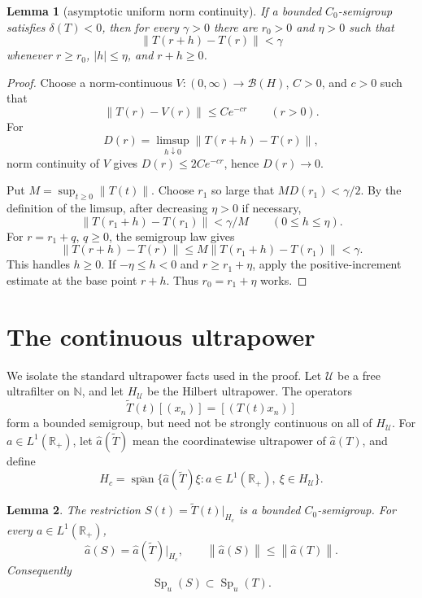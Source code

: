 \documentclass[11pt]{article}
\newtheorem{lemma}{Lemma}
\newcommand{\R}{\mathbb R}
\newcommand{\B}{\mathcal B}
\newcommand{\norm}[1]{\left\lVert#1\right\rVert}
\newcommand{\Spu}{\operatorname{Sp}_{u}}
\begin{document}
\begin{lemma}[asymptotic uniform norm continuity]\label{lem:tail-cont}
If a bounded \(C_0\)-semigroup satisfies \(\delta(T)<0\), then for every
\(\gamma>0\) there are \(r_0>0\) and \(\eta>0\) such that
\[
 \norm{T(r+h)-T(r)}<\gamma
\]
whenever \(r\ge r_0\), \(|h|\le\eta\), and \(r+h\ge0\).
\end{lemma}

\begin{proof}
Choose a norm-continuous \(V:(0,\infty)\to\B(H)\), \(C>0\), and \(c>0\)
such that
\[
 \norm{T(r)-V(r)}\le Ce^{-cr}\qquad(r>0).
\]
For
\[
 D(r)=\limsup_{h\downarrow0}\norm{T(r+h)-T(r)},
\]
norm continuity of \(V\) gives \(D(r)\le2Ce^{-cr}\), hence \(D(r)\to0\).

Put \(M=\sup_{t\ge0}\norm{T(t)}\). Choose \(r_1\) so large that
\(MD(r_1)<\gamma/2\). By the definition of the limsup, after decreasing
\(\eta>0\) if necessary,
\[
 \norm{T(r_1+h)-T(r_1)}<\gamma/M
 \qquad(0\le h\le\eta).
\]
For \(r=r_1+q\), \(q\ge0\), the semigroup law gives
\[
 \norm{T(r+h)-T(r)}
 \le M\norm{T(r_1+h)-T(r_1)}<\gamma.
\]
This handles \(h\ge0\). If \(-\eta\le h<0\) and \(r\ge r_1+\eta\), apply
the positive-increment estimate at the base point \(r+h\). Thus
\(r_0=r_1+\eta\) works.
\end{proof}

\section{The continuous ultrapower}

We isolate the standard ultrapower facts used in the proof. Let
\(\mathcal U\) be a free ultrafilter on \(\mathbb N\), and let
\(H_{\mathcal U}\) be the Hilbert ultrapower. The operators
\[
 \widetilde T(t)[(x_n)]=[(T(t)x_n)]
\]
form a bounded semigroup, but need not be strongly continuous on all of
\(H_{\mathcal U}\). For \(a\in L^1(\R_+)\), let
\(\widehat a(\widetilde T)\) mean the coordinatewise ultrapower of
\(\widehat a(T)\), and define
\begin{equation}\label{eq:Hc}
 H_c=\overline{\operatorname{span}}
 \{\widehat a(\widetilde T)\xi:a\in L^1(\R_+),\ \xi\in H_{\mathcal U}\}.
\end{equation}

\begin{lemma}\label{lem:ultrapower}
The restriction \(S(t)=\widetilde T(t)|_{H_c}\) is a bounded \(C_0\)-semigroup.
For every \(a\in L^1(\R_+)\),
\begin{equation}\label{eq:integrated-bound}
 \widehat a(S)=\widehat a(\widetilde T)|_{H_c},
 \qquad
 \norm{\widehat a(S)}\le\norm{\widehat a(T)}.
\end{equation}
Consequently
\begin{equation}\label{eq:spectrum-inclusion}
 \Spu(S)\subset\Spu(T).
\end{equation}
\end{lemma}
\end{document}
